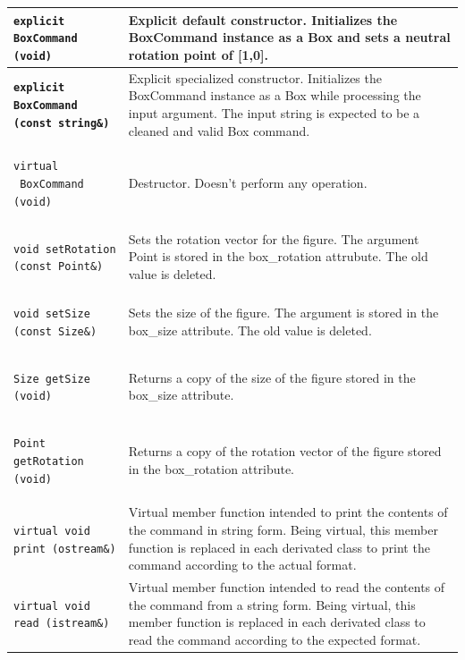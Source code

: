 \documentclass[11pt,twoside,openany,x11names,svgnames]{memoir}
\begin{document}
\begin{table}[h]\footnotesize
\centering
\begin{tabular}{| >{\bfseries}p{9cm} | p{6.5cm} |}
	\hline
	
	\texttt{explicit BoxCommand (void)} & Explicit default constructor. Initializes the BoxCommand instance as a Box and sets a neutral rotation point of [1,0]. \\
	
	\hline
	
	\texttt{explicit BoxCommand (const string\&)} & Explicit specialized constructor. Initializes the BoxCommand instance as a Box while processing the input argument. The input string is expected to be a cleaned and valid Box command. \\
	
	\hline
	
	\texttt{virtual ~BoxCommand (void)} & Destructor. Doesn't perform any operation. \\
	
	\hline
	
	\texttt{void setRotation (const Point\&)} & Sets the rotation vector for the figure. The argument Point is stored in the box\_rotation attrubute. The old value is deleted. \\
	
	\hline	
	
	\texttt{void setSize (const Size\&)} & Sets the size of the figure. The argument is stored in the box\_size attribute. The old value is deleted. \\
	
	\hline	
	
	\texttt{Size getSize (void)} & Returns a copy of the size of the figure stored in the box\_size attribute. \\
		
	\hline
	
	\texttt{Point getRotation (void)} & Returns a copy of the rotation vector of the figure stored in the box\_rotation attribute. \\
		
	\hline
	
	\texttt{virtual void print (ostream\&)} & Virtual member function intended to print the contents of the command in string form. Being virtual, this member function is replaced in each derivated class to print the command according to the actual format. \\
	
	\hline
	
	\texttt{virtual void read (istream\&)} & Virtual member function intended to read the contents of the command from a string form. Being virtual, this member function is replaced in each derivated class to read the command according to the expected format. \\
	

\end{tabular}
\end{table}
\end{document}
